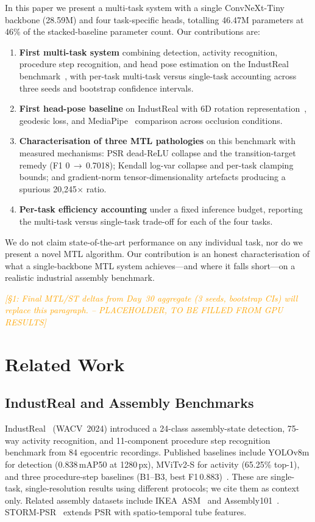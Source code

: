 \documentclass[conference]{IEEEtran}
\newcommand{\resultplaceholder}[1]{\textcolor{orange}{\emph{[#1 -- PLACEHOLDER, TO BE FILLED FROM GPU RESULTS]}}}
\begin{document}
In this paper we present a multi-task system with a single ConvNeXt-Tiny backbone (28.59M) and four task-specific heads, totalling 46.47M parameters at 46\% of the stacked-baseline parameter count. Our contributions are:

\begin{enumerate}
    \item \textbf{First multi-task system} combining detection, activity recognition, procedure step recognition, and head pose estimation on the IndustReal benchmark~\cite{schoonbeek2024industreal}, with per-task multi-task versus single-task accounting across three seeds and bootstrap confidence intervals.
    \item \textbf{First head-pose baseline} on IndustReal with 6D rotation representation~\cite{zhou2019continuity}, geodesic loss, and MediaPipe~\cite{mediapipe} comparison across occlusion conditions.
    \item \textbf{Characterisation of three MTL pathologies} on this benchmark with measured mechanisms: PSR dead-ReLU collapse and the transition-target remedy (F1 0\,$\to$\,0.7018); Kendall log-var collapse and per-task clamping bounds; and gradient-norm tensor-dimensionality artefacts producing a spurious 20,245$\times$ ratio.
    \item \textbf{Per-task efficiency accounting} under a fixed inference budget, reporting the multi-task versus single-task trade-off for each of the four tasks.
\end{enumerate}

We do not claim state-of-the-art performance on any individual task, nor do we present a novel MTL algorithm. Our contribution is an honest characterisation of what a single-backbone MTL system achieves---and where it falls short---on a realistic industrial assembly benchmark.

\resultplaceholder{§1: Final MTL/ST deltas from Day~30 aggregate (3 seeds, bootstrap CIs) will replace this paragraph.}

\section{Related Work}
\label{sec:related}

\subsection{IndustReal and Assembly Benchmarks}
IndustReal~\cite{schoonbeek2024industreal} (WACV~2024) introduced a 24-class assembly-state detection, 75-way activity recognition, and 11-component procedure step recognition benchmark from 84 egocentric recordings. Published baselines include YOLOv8m for detection (0.838\,mAP50 at 1280\,px), MViTv2-S for activity (65.25\% top-1), and three procedure-step baselines (B1--B3, best F1\,0.883)~\cite{schoonbeek2024industreal}. These are single-task, single-resolution results using different protocols; we cite them as context only. Related assembly datasets include IKEA~ASM~\cite{benshabat2021ikea} and Assembly101~\cite{sener2022assembly101}. STORM-PSR~\cite{schoonbeek2025storm} extends PSR with spatio-temporal tube features.
\end{document}
